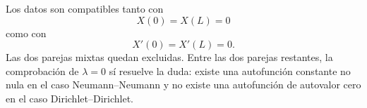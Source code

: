 Los datos son compatibles tanto con
\[
X(0)=X(L)=0
\]
como con
\[
X'(0)=X'(L)=0.
\]
Las dos parejas mixtas quedan excluidas. Entre las dos parejas restantes, la comprobación de \(\lambda=0\) sí resuelve la duda: existe una autofunción constante no nula en el caso Neumann--Neumann y no existe una autofunción de autovalor cero en el caso Dirichlet--Dirichlet.
